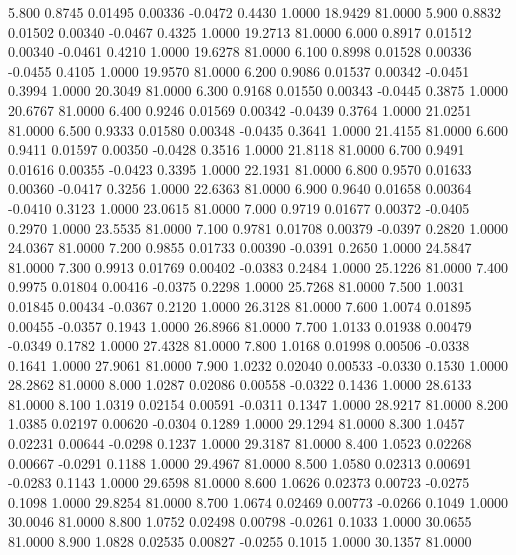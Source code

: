    5.800   0.8745   0.01495   0.00336  -0.0472   0.4430   1.0000  18.9429  81.0000
   5.900   0.8832   0.01502   0.00340  -0.0467   0.4325   1.0000  19.2713  81.0000
   6.000   0.8917   0.01512   0.00340  -0.0461   0.4210   1.0000  19.6278  81.0000
   6.100   0.8998   0.01528   0.00336  -0.0455   0.4105   1.0000  19.9570  81.0000
   6.200   0.9086   0.01537   0.00342  -0.0451   0.3994   1.0000  20.3049  81.0000
   6.300   0.9168   0.01550   0.00343  -0.0445   0.3875   1.0000  20.6767  81.0000
   6.400   0.9246   0.01569   0.00342  -0.0439   0.3764   1.0000  21.0251  81.0000
   6.500   0.9333   0.01580   0.00348  -0.0435   0.3641   1.0000  21.4155  81.0000
   6.600   0.9411   0.01597   0.00350  -0.0428   0.3516   1.0000  21.8118  81.0000
   6.700   0.9491   0.01616   0.00355  -0.0423   0.3395   1.0000  22.1931  81.0000
   6.800   0.9570   0.01633   0.00360  -0.0417   0.3256   1.0000  22.6363  81.0000
   6.900   0.9640   0.01658   0.00364  -0.0410   0.3123   1.0000  23.0615  81.0000
   7.000   0.9719   0.01677   0.00372  -0.0405   0.2970   1.0000  23.5535  81.0000
   7.100   0.9781   0.01708   0.00379  -0.0397   0.2820   1.0000  24.0367  81.0000
   7.200   0.9855   0.01733   0.00390  -0.0391   0.2650   1.0000  24.5847  81.0000
   7.300   0.9913   0.01769   0.00402  -0.0383   0.2484   1.0000  25.1226  81.0000
   7.400   0.9975   0.01804   0.00416  -0.0375   0.2298   1.0000  25.7268  81.0000
   7.500   1.0031   0.01845   0.00434  -0.0367   0.2120   1.0000  26.3128  81.0000
   7.600   1.0074   0.01895   0.00455  -0.0357   0.1943   1.0000  26.8966  81.0000
   7.700   1.0133   0.01938   0.00479  -0.0349   0.1782   1.0000  27.4328  81.0000
   7.800   1.0168   0.01998   0.00506  -0.0338   0.1641   1.0000  27.9061  81.0000
   7.900   1.0232   0.02040   0.00533  -0.0330   0.1530   1.0000  28.2862  81.0000
   8.000   1.0287   0.02086   0.00558  -0.0322   0.1436   1.0000  28.6133  81.0000
   8.100   1.0319   0.02154   0.00591  -0.0311   0.1347   1.0000  28.9217  81.0000
   8.200   1.0385   0.02197   0.00620  -0.0304   0.1289   1.0000  29.1294  81.0000
   8.300   1.0457   0.02231   0.00644  -0.0298   0.1237   1.0000  29.3187  81.0000
   8.400   1.0523   0.02268   0.00667  -0.0291   0.1188   1.0000  29.4967  81.0000
   8.500   1.0580   0.02313   0.00691  -0.0283   0.1143   1.0000  29.6598  81.0000
   8.600   1.0626   0.02373   0.00723  -0.0275   0.1098   1.0000  29.8254  81.0000
   8.700   1.0674   0.02469   0.00773  -0.0266   0.1049   1.0000  30.0046  81.0000
   8.800   1.0752   0.02498   0.00798  -0.0261   0.1033   1.0000  30.0655  81.0000
   8.900   1.0828   0.02535   0.00827  -0.0255   0.1015   1.0000  30.1357  81.0000
